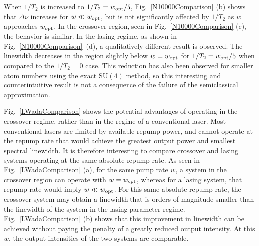 \documentclass[aps,
twocolumn,
showpacs,
superscriptaddress,groupedaddress]{revtex4}
\begin{document}
When $1/T_2$ is increased to $1/T_2=w_{\rm opt}/5$,
Fig.~\ref{N10000Comparison} (b) shows that $\Delta \nu$ increases for
$w\ll w_{\rm opt}$, but is not significantly affected by $1/T_2$ as $w$
approaches $w_{\rm opt}$. In the crossover region, seen in
Fig.~\ref{N10000Comparison} (c), the behavior is similar. In the lasing
regime, as shown in Fig.~\ref{N10000Comparison}~(d), a qualitatively
different result is observed. The linewidth decreases in the region
slightly below $w=w_{\rm opt}$ for $1/T_2=w_{\rm opt}/5$ when compared
to the $1/T_2=0$ case. This reduction has also been observed for smaller
atom numbers using the exact $\mathrm{SU}(4)$ method, so this
interesting and counterintuitive result is not a consequence of the
failure of the semiclassical approximation.

Fig.~\ref{LWadaComparison} shows the potential advantages of operating
in the crossover regime, rather than in the regime of a conventional
laser. Most conventional lasers are limited by available repump power,
and cannot operate at the repump rate that would achieve the greatest
output power and smallest spectral linewidth. It is therefore
interesting to compare crossover and lasing systems operating at the
same absolute repump rate.  As seen in Fig.~\ref{LWadaComparison} (a),
for the same pump rate $w$, a system in the crossover region can
operate with $w=w_{\rm opt}$, whereas for a lasing system, that repump
rate would imply $w\ll w_{\rm opt}$. For this same absolute repump
rate, the crossover system may obtain a linewidth that is orders of
magnitude smaller than the linewidth of the system in the lasing
parameter regime.  Fig.~\ref{LWadaComparison} (b) shows that this
improvement in linewidth can be achieved without paying the penalty of
a greatly reduced output intensity. At this $w$, the output
intensities of the two systems are comparable. 
\end{document}
